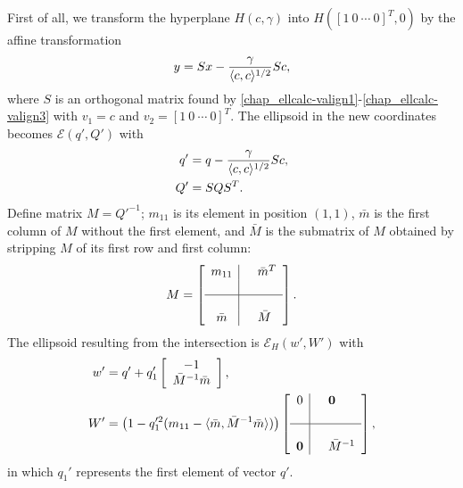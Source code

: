 \documentclass[letterpaper,10pt,english]{sphinxmanual}
\begin{document}
First of all, we transform the hyperplane \(H(c,\gamma)\) into
\(H([1~0~\cdots~0]^T, 0)\) by the affine transformation
\begin{gather}
\begin{split}y = Sx - \frac{\gamma}{\langle c,c\rangle^{1/2}}Sc,\end{split}\notag
\end{gather}
where \(S\) is an orthogonal matrix found by \eqref{chap_ellcalc-valign1}-\eqref{chap_ellcalc-valign3}
with \(v_1=c\) and \(v_2=[1~0~\cdots~0]^T\). The ellipsoid in
the new coordinates becomes \({\mathcal E}(q',Q')\) with
\begin{gather}
\begin{split}\begin{aligned}
q' & = q-\frac{\gamma}{\langle c,c\rangle^{1/2}}Sc, \\
Q' & = SQS^T.\end{aligned}\end{split}\notag
\end{gather}
Define matrix \(M=Q'^{-1}\); \(m_{11}\) is its element in
position \((1,1)\), \(\bar{m}\) is the first column of \(M\)
without the first element, and \(\bar{M}\) is the submatrix of
\(M\) obtained by stripping \(M\) of its first row and first
column:
\begin{gather}
\begin{split}M = \left[\begin{array}{c|cl}
m_{11} & & \bar{m}^T\\
 & \\
\hline
 & \\
\bar{m} & & \bar{M}\end{array}\right].\end{split}\notag
\end{gather}
The ellipsoid resulting from the intersection is
\({\mathcal E}_H(w',W')\) with
\begin{gather}
\begin{split}\begin{aligned}
w' & = q' + q_1'\left[\begin{array}{c}
-1\\
\bar{M}^{-1}\bar{m}\end{array}\right],\\
W' & = \left(1-q_1'^2(m_{11}-
\langle\bar{m},\bar{M}^{-1}\bar{m}\rangle)\right)\left[\begin{array}{c|cl}
0 & & {\bf 0}\\
 & \\
\hline
 & \\
{\bf 0} & & \bar{M}^{-1}\end{array}\right],\end{aligned}\end{split}\notag
\end{gather}
in which \(q_1'\) represents the first element of vector \(q'\).
\end{document}
